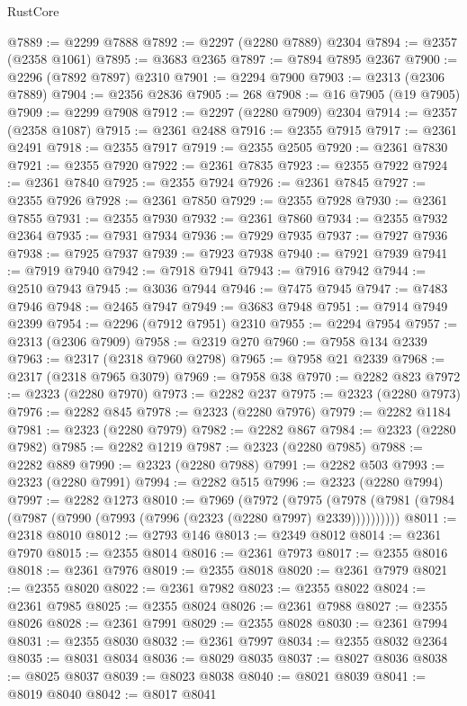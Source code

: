 \begin{lexlean}{RustCore}
\begin{coremodule}
@7889 := @2299 @7888
@7892 := @2297 (@2280 @7889) @2304
@7894 := @2357 (@2358 @1061)
@7895 := @3683 @2365
@7897 := @7894 @7895 @2367
@7900 := @2296 (@7892 @7897) @2310
@7901 := @2294 @7900
@7903 := @2313 (@2306 @7889)
@7904 := @2356 @2836
@7905 := 268
@7908 := @16 @7905 (@19 @7905)
@7909 := @2299 @7908
@7912 := @2297 (@2280 @7909) @2304
@7914 := @2357 (@2358 @1087)
@7915 := @2361 @2488
@7916 := @2355 @7915
@7917 := @2361 @2491
@7918 := @2355 @7917
@7919 := @2355 @2505
@7920 := @2361 @7830
@7921 := @2355 @7920
@7922 := @2361 @7835
@7923 := @2355 @7922
@7924 := @2361 @7840
@7925 := @2355 @7924
@7926 := @2361 @7845
@7927 := @2355 @7926
@7928 := @2361 @7850
@7929 := @2355 @7928
@7930 := @2361 @7855
@7931 := @2355 @7930
@7932 := @2361 @7860
@7934 := @2355 @7932 @2364
@7935 := @7931 @7934
@7936 := @7929 @7935
@7937 := @7927 @7936
@7938 := @7925 @7937
@7939 := @7923 @7938
@7940 := @7921 @7939
@7941 := @7919 @7940
@7942 := @7918 @7941
@7943 := @7916 @7942
@7944 := @2510 @7943
@7945 := @3036 @7944
@7946 := @7475 @7945
@7947 := @7483 @7946
@7948 := @2465 @7947
@7949 := @3683 @7948
@7951 := @7914 @7949 @2399
@7954 := @2296 (@7912 @7951) @2310
@7955 := @2294 @7954
@7957 := @2313 (@2306 @7909)
@7958 := @2319 @270
@7960 := @7958 @134 @2339
@7963 := @2317 (@2318 @7960 @2798)
@7965 := @7958 @21 @2339
@7968 := @2317 (@2318 @7965 @3079)
@7969 := @7958 @38
@7970 := @2282 @823
@7972 := @2323 (@2280 @7970)
@7973 := @2282 @237
@7975 := @2323 (@2280 @7973)
@7976 := @2282 @845
@7978 := @2323 (@2280 @7976)
@7979 := @2282 @1184
@7981 := @2323 (@2280 @7979)
@7982 := @2282 @867
@7984 := @2323 (@2280 @7982)
@7985 := @2282 @1219
@7987 := @2323 (@2280 @7985)
@7988 := @2282 @889
@7990 := @2323 (@2280 @7988)
@7991 := @2282 @503
@7993 := @2323 (@2280 @7991)
@7994 := @2282 @515
@7996 := @2323 (@2280 @7994)
@7997 := @2282 @1273
@8010 := @7969
    (@7972
      (@7975 (@7978 (@7981 (@7984 (@7987 (@7990 (@7993 (@7996 (@2323 (@2280 @7997) @2339))))))))))
@8011 := @2318 @8010
@8012 := @2793 @146
@8013 := @2349 @8012
@8014 := @2361 @7970
@8015 := @2355 @8014
@8016 := @2361 @7973
@8017 := @2355 @8016
@8018 := @2361 @7976
@8019 := @2355 @8018
@8020 := @2361 @7979
@8021 := @2355 @8020
@8022 := @2361 @7982
@8023 := @2355 @8022
@8024 := @2361 @7985
@8025 := @2355 @8024
@8026 := @2361 @7988
@8027 := @2355 @8026
@8028 := @2361 @7991
@8029 := @2355 @8028
@8030 := @2361 @7994
@8031 := @2355 @8030
@8032 := @2361 @7997
@8034 := @2355 @8032 @2364
@8035 := @8031 @8034
@8036 := @8029 @8035
@8037 := @8027 @8036
@8038 := @8025 @8037
@8039 := @8023 @8038
@8040 := @8021 @8039
@8041 := @8019 @8040
@8042 := @8017 @8041

\end{coremodule}
\end{lexlean}
